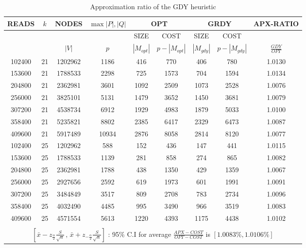 \documentclass[runningheads]{llncs}
\begin{document}
\begin{table}
\begin{center}
\begin{tabular}{|c|c|c|c|c|c|c|c|c|}
\hline
READS &  $k$ & NODES & $\max{|P|, |Q|}$ &\multicolumn{2}{|c|}{OPT} & \multicolumn{2}{|c|}{GRDY} & APX-RATIO\\ 
\hline
 & & & &SIZE&COST&SIZE&COST \\
\hline
 &&$|V|$&$p$&$|M_{opt}|$ & $p-|M_{opt}|$ & $|M_{gdy}|$ & $p-|M_{gdy}|$ & $\frac{GDY}{OPT}$ \\
\hline
102400 & 21 & 1202962 & 1186 & 416 & 770 & 406 & 780 & 1.0130 \\ 
\hline
153600 & 21 & 1788533 & 2298 & 725 & 1573 & 704 & 1594 & 1.0134 \\ 
\hline
204800 & 21 & 2362981 & 3601 & 1092 & 2509 & 1073 & 2528 & 1.0076 \\ 
\hline
256000 & 21 & 3825101 & 5131 & 1479 & 3652 & 1450 & 3681 & 1.0079 \\ 
\hline
307200 & 21 & 4538734 & 6912 & 1929 & 4983 & 1879 & 5033 & 1.0100 \\ 
\hline
358400 & 21 & 5235821 & 8802 & 2385 & 6417 & 2329 & 6473 & 1.0087 \\ 
\hline
409600 & 21 & 5917489 & 10934 & 2876 & 8058 & 2814 & 8120 & 1.0077 \\ 
\hline
102400 & 25 & 1202962 & 588 & 152 & 436 & 147 & 441 & 1.0115 \\ 
\hline
153600 & 25 & 1788533 & 1139 & 281 & 858 & 274 & 865 & 1.0082 \\ 
\hline
204800 & 25 & 2362981 & 1788 & 438 & 1350 & 429 & 1359 & 1.0067 \\ 
\hline
256000 & 25 & 2927656 & 2592 & 619 & 1973 & 601 & 1991 & 1.0091 \\ 
\hline
307200 & 25 & 3484849 & 3517 & 809 & 2708 & 783 & 2734 & 1.0096 \\ 
\hline
358400 & 25 & 4032490 & 4485 & 995 & 3490 & 966 & 3519 & 1.0083 \\ 
\hline
409600 & 25 & 4571554 & 5613 & 1220 & 4393 & 1175 & 4438 & 1.0102 \\ 
\hline
\multicolumn{9}{|c|}{}\\ 
 \multicolumn{9}{|c|}{$\left[\bar{x}-z_{\frac{\alpha}{2}}\frac{S}{\sqrt{n}}\,,\,\bar{x}+z_{-\frac{\alpha}{2}}\frac{S}{\sqrt{n}} \right]$ :  95\% C.I for average $\frac{APX-COST}{OPT-COST}$ is $[1.0083\%,1.0106\%]$} \\ 
\hline
\end{tabular}
 \end{center}
\caption{Approximation ratio of the {\sf GDY} heuristic}
\label{tab:appx}
\end{table}
\end{document}
